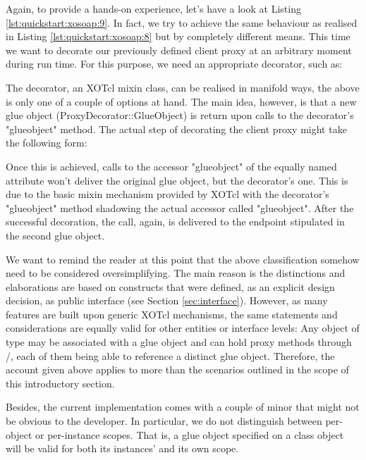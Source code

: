 Again, to provide a hands-on experience, let's have a look at Listing \ref{lst:quickstart:xosoap:9}. In fact, we try to achieve the same behaviour as realised in Listing \ref{lst:quickstart:xosoap:8} but by completely different means. This time we want to decorate our previously defined client proxy at an arbitrary moment during run time. For this purpose, we need an appropriate decorator, such as:
%

%
The decorator, an XOTcl mixin class, can be realised in manifold ways, the above is only one of a couple of options at hand. The main idea, however, is that a new glue object (ProxyDecorator::GlueObject) is return upon calls to the decorator's "glueobject" method. The actual step of decorating the client proxy might take the following form:
%

%
Once this is achieved, calls to the accessor "glueobject" of the equally named attribute won't deliver the original glue object, but the decorator's one. This is due to the basic mixin mechanism provided by XOTcl with the decorator's "glueobject" method shadowing the actual accessor called "glueobject". 
After the successful decoration, the call, again, is delivered to the endpoint stipulated in the second glue object.

We want to remind the reader at this point that the above classification somehow need to be considered oversimplifying. The main reason is the distinctions and elaborations are based on constructs that were defined, as an explicit design decision, as public interface (see Section \ref{sec:interface}). However,  as many features are built upon generic XOTcl mechanisms, the same statements and considerations are equally valid for other entities or interface levels: Any object of type  may be associated with a glue object and can hold proxy methods through /, each of them being able to reference a distinct glue object. Therefore, the account given above applies to more than the scenarios outlined in the scope of this introductory section.

Besides, the current implementation comes with a couple of minor that might not be obvious to the developer. In particular, we do not distinguish between per-object or per-instance scopes. That is, a glue object specified on a class object will be valid for both its instances' and its own scope.
